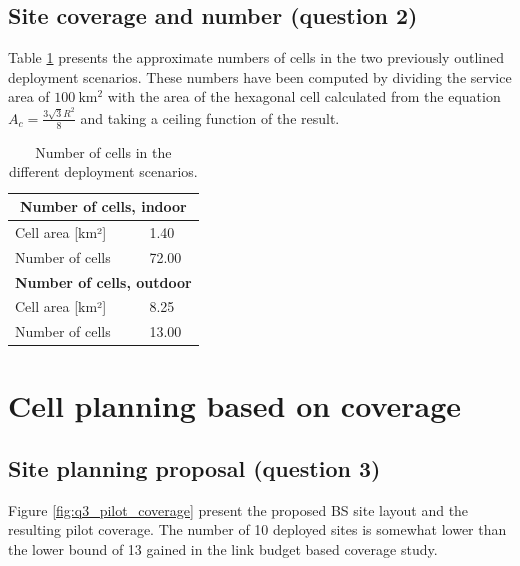 \documentclass{article}
\begin{document}
\subsection{Site coverage and number (question 2)}

Table \ref{tab:cell_numbers} presents the approximate numbers of cells in the two previously outlined deployment scenarios. These numbers have been computed by dividing the service area of \(\SI{100}{\kilo\metre\squared}\) with the area of the hexagonal cell calculated from the equation \(A_c = \frac{3 \sqrt{3} R^2}{8} \) and taking a ceiling function of the result.

\begin{table}[!htb]
    \centering
    \begin{tabular}{|l|l|}
    \hline
    \multicolumn{2}{|c|}{\textbf{Number of cells, indoor}} \\ \hline
    Cell area {[}km²{]}                    & 1.40                                        \\ \hline
    Number of cells                        & 72.00                                       \\ \hline
    \multicolumn{2}{|c|}{\textbf{Number of cells, outdoor}} \\ \hline
    Cell area {[}km²{]}                    & 8.25                                        \\ \hline
    Number of cells                        & 13.00                                       \\ \hline
    \end{tabular}
    \caption{Number of cells in the different deployment scenarios.}
    \label{tab:cell_numbers}
\end{table}

\section{Cell planning based on coverage}
\subsection{Site planning proposal (question 3)}
Figure \ref{fig:q3_pilot_coverage} present the proposed BS site layout and the resulting pilot coverage. The number of 10 deployed sites is somewhat lower than the lower bound of 13 gained in the link budget based coverage study.
\end{document}
